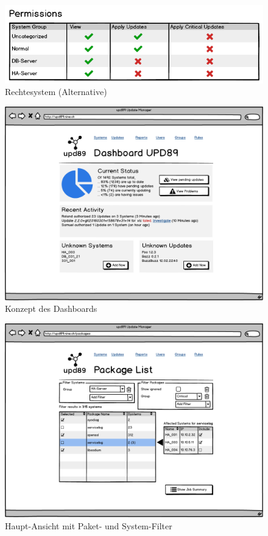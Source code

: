 \begin{figure}[H]
	\centering
	\includegraphics[width=0.75\linewidth]{files/mockups/permission_2}
	\caption{Rechtesystem (Alternative)}
	\label{fig:design:permission_2}
\end{figure}

\begin{figure}[H]
	\centering
	\includegraphics[width=\linewidth]{files/mockups/dashboard}
	\caption{Konzept des Dashboards}
	\label{fig:design:dashboard_mockup}
\end{figure}

\begin{figure}[H]
	\centering
	\includegraphics[width=\linewidth]{files/mockups/combo_view}
	\caption{Haupt-Ansicht mit Paket- und System-Filter}
	\label{fig:design:combo_view_mockup}
\end{figure}

